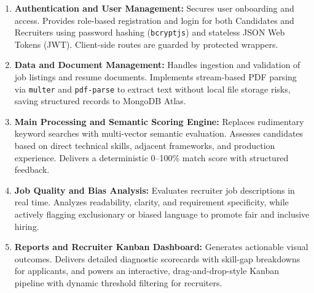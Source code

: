 \documentclass[12pt, a4paper]{article}
\begin{document}
\begin{enumerate}[label=\textbf{Module \arabic* --}, leftmargin=2em, itemsep=5pt]
    \item \textbf{Authentication and User Management:}
    Secures user onboarding and access. Provides role-based registration and login for both Candidates and Recruiters using password hashing (\texttt{bcryptjs}) and stateless JSON Web Tokens (JWT). Client-side routes are guarded by protected wrappers.

    \item \textbf{Data and Document Management:}
    Handles ingestion and validation of job listings and resume documents. Implements stream-based PDF parsing via \texttt{multer} and \texttt{pdf-parse} to extract text without local file storage risks, saving structured records to MongoDB Atlas.

    \item \textbf{Main Processing and Semantic Scoring Engine:}
    Replaces rudimentary keyword searches with multi-vector semantic evaluation. Assesses candidates based on direct technical skills, adjacent frameworks, and production experience. Delivers a deterministic 0--100\% match score with structured feedback.

    \item \textbf{Job Quality and Bias Analysis:}
    Evaluates recruiter job descriptions in real time. Analyzes readability, clarity, and requirement specificity, while actively flagging exclusionary or biased language to promote fair and inclusive hiring.

    \item \textbf{Reports and Recruiter Kanban Dashboard:}
    Generates actionable visual outcomes. Delivers detailed diagnostic scorecards with skill-gap breakdowns for applicants, and powers an interactive, drag-and-drop-style Kanban pipeline with dynamic threshold filtering for recruiters.
\end{enumerate}

\newpage

\end{document}
